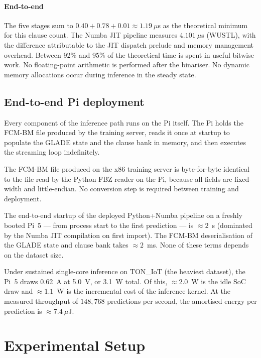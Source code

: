 \documentclass[journal,10pt]{IEEEtran}
\begin{document}
\paragraph{End-to-end}
The five stages sum to $0.40 + 0.78 + 0.01 \approx 1.19~\mu$s
as the theoretical minimum for this clause count. The Numba JIT pipeline
measures $4.101~\mu$s (WUSTL), with the difference attributable to
the JIT dispatch prelude and memory management overhead.
Between 92\% and 95\%
of the theoretical time is spent in useful bitwise work. No
floating-point arithmetic is performed after the binariser. No
dynamic memory allocations occur during inference in the steady state.

\subsection{End-to-end Pi deployment}
\label{sec:hw-endtoend}

Every component of the inference path runs on the Pi itself. The Pi
holds the FCM-BM file produced by the training server, reads it once
at startup to populate the GLADE state and the clause bank in memory,
and then executes the streaming loop indefinitely.

The FCM-BM file produced on the x86 training server is byte-for-byte
identical to the file read by the Python FBZ reader on the Pi, because
all fields are fixed-width and little-endian. No conversion step is
required between training and deployment.

The end-to-end startup of the deployed Python+Numba pipeline on a freshly booted
Pi~5 --- from process start to the first prediction --- is
$\approx 2$~s (dominated by the Numba JIT compilation on first import).
The FCM-BM deserialisation of
the GLADE state and clause bank takes $\approx 2$~ms. None of these terms depends on the dataset size.

Under sustained single-core inference on TON\_IoT (the heaviest
dataset), the Pi~5 draws 0.62~A at 5.0~V, or 3.1~W total. Of this,
$\approx 2.0$~W is the idle SoC draw and $\approx 1.1$~W is the
incremental cost of the inference kernel. At the measured throughput
of $148{,}768$ predictions per second, the amortised energy per
prediction is $\approx 7.4~\mu$J.

\section{Experimental Setup}
\label{sec:setup}
\end{document}
